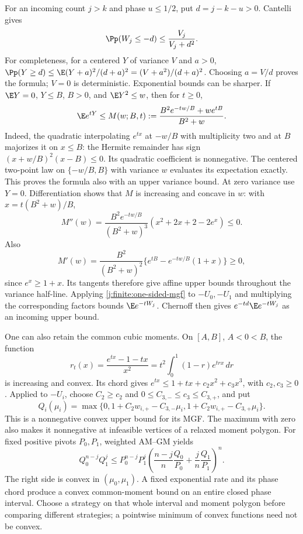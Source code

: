 For an incoming count $j>k$ and phase $u\le1/2$, put $d=j-k-u>0$.
Cantelli gives
\[
 \Pp(W_j\le-d)\le\frac{V_j}{V_j+d^2}.
\]
For completeness, for a centered $Y$ of variance $V$ and $a>0$,
$\Pp(Y\ge d)\le\E(Y+a)^2/(d+a)^2=(V+a^2)/(d+a)^2$.
Choosing $a=V/d$ proves the formula; $V=0$ is deterministic.
Exponential bounds can be sharper. If $\E Y=0$, $Y\le B$, $B>0$,
and $\E Y^2\le w$, then for $t\ge0$,
\begin{equation}\label{j:finite:one-sided-mgf}
 \E e^{tY}\le
 M(w;B,t):=\frac{B^2e^{-tw/B}+we^{tB}}{B^2+w}.
\end{equation}
Indeed, the quadratic interpolating $e^{tx}$ at $-w/B$ with multiplicity
two and at $B$ majorizes it on $x\le B$: the Hermite remainder has
sign $(x+w/B)^2(x-B)\le0$. Its quadratic coefficient is nonnegative.
The centered two-point law on $\{-w/B,B\}$ with variance $w$ evaluates
its expectation exactly. This proves the formula also with an upper
variance bound. At zero variance use $Y=0$.
Differentiation shows that $M$ is increasing and concave in $w$:
with $x=t(B^2+w)/B$,
\[
 M''(w)=\frac{B^2e^{-tw/B}}{(B^2+w)^3}
          (x^2+2x+2-2e^x)\le0.
\]
Also
\[
 M'(w)=\frac{B^2}{(B^2+w)^2}
 \{e^{tB}-e^{-tw/B}(1+x)\}\ge0,
\]
since $e^x\ge1+x$. Its tangents therefore give affine upper bounds throughout the variance
half-line. Applying \eqref{j:finite:one-sided-mgf} to $-U_0,-U_1$ and
multiplying the corresponding factors bounds $\E e^{-tW_j}$.
Chernoff then gives $e^{-td}\E e^{-tW_j}$ as an incoming upper bound.

One can also retain the common cubic moments. On $[A,B]$, $A<0<B$,
the function
\[
 r_t(x)=\frac{e^{tx}-1-tx}{x^2}
       =t^2\int_0^1(1-r)e^{trx}\,dr
\]
is increasing and convex. Its chord gives
$e^{tx}\le1+tx+c_2x^2+c_3x^3$, with $c_2,c_3\ge0$.
Applied to $-U_i$, choose $C_2\ge c_2$ and
$0\le C_{3,-}\le c_3\le C_{3,+}$, and put
\[
 Q_i(\mu_i)=\max\{0,1+C_2w_{i,+}-C_{3,-}\mu_i,
                     1+C_2w_{i,+}-C_{3,+}\mu_i\}.
\]
This is a nonnegative convex upper bound for its MGF. The maximum with zero
also makes it nonnegative at infeasible vertices of a relaxed moment polygon.
For fixed positive pivots $P_0,P_1$, weighted AM--GM yields
\[
 Q_0^{n-j}Q_1^j\le P_0^{n-j}P_1^j
 \left(\frac{n-j}{n}\frac{Q_0}{P_0}
       +\frac{j}{n}\frac{Q_1}{P_1}\right)^n.
\]
The right side is convex in $(\mu_0,\mu_1)$. A fixed exponential rate
and its phase chord produce a convex common-moment bound on an entire
closed phase interval. Choose a strategy on that whole interval and
moment polygon before comparing different strategies; a pointwise
minimum of convex functions need not be convex.

